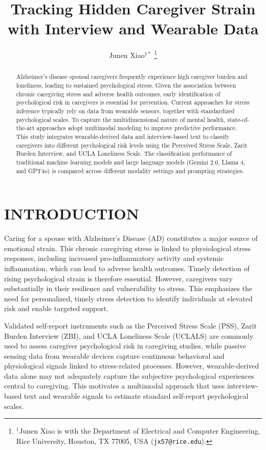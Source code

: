 \documentclass[letterpaper, 10 pt, conference]{ieeeconf}  %
\title{\LARGE \bf
Tracking Hidden Caregiver Strain with Interview and Wearable Data
}
\author{%
Junen Xiao$^{1*}$%
\thanks{$^{1}$Junen Xiao is with the Department of Electrical and Computer Engineering, Rice University, Houston, TX 77005, USA (\texttt{jx57@rice.edu}).}%
}
\begin{document}
\maketitle
\thispagestyle{empty}
\pagestyle{empty}


\begin{abstract}
Alzheimer’s disease spousal caregivers frequently experience high caregiver burden and loneliness, leading to sustained psychological stress. Given the association between chronic caregiving stress and adverse health outcomes, early identification of psychological risk in caregivers is essential for prevention.
Current approaches for stress inference typically rely on data from wearable sensors, together with standardized psychological scales. To capture the multidimensional nature of mental health, state-of-the-art approaches adopt multimodal modeling to improve predictive performance.
This study integrates wearable-derived data and interview-based text to classify caregivers into different psychological risk levels using the Perceived Stress Scale, Zarit Burden Interview, and UCLA Loneliness Scale. The classification performance of traditional machine learning models and large language models (Gemini 2.0, Llama 4, and GPT4o) is compared across different modality settings and prompting strategies.
\end{abstract}


\section{INTRODUCTION}
Caring for a spouse with Alzheimer’s Disease (AD) constitutes a major source of emotional strain\cite{stress}. This chronic caregiving stress is linked to physiological stress responses, including increased pro-inflammatory activity and systemic inflammation, which can lead to adverse health outcomes. Timely detection of rising psychological strain is therefore essential. However, caregivers vary substantially in their resilience and vulnerability to stress. This emphasizes the need for personalized, timely stress detection to identify individuals at elevated risk and enable targeted support.

Validated self-report instruments such as the Perceived Stress Scale (PSS), Zarit Burden Interview (ZBI), and UCLA Loneliness Scale (UCLALS) are commonly used to assess caregiver psychological risk\cite{pss,ucla,ZBI} in caregiving studies, while passive sensing data from wearable devices capture continuous behavioral and physiological signals linked to stress-related processes\cite{smets2018large}. However, wearable-derived data alone may not adequately capture the subjective psychological experiences central to caregiving. This motivates a multimodal approach that uses interview-based text and wearable signals to estimate standard self-report psychological scales.
\end{document}

